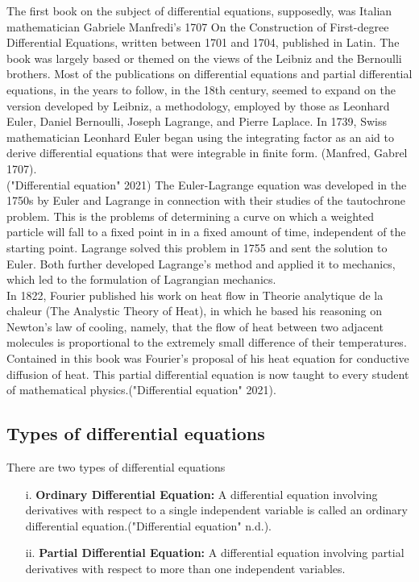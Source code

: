 \documentclass[12pt]{report}
\begin{document}
The first book on the subject of differential equations, supposedly, was Italian mathematician Gabriele Manfredi’s 1707 On the Construction of First-degree Differential Equations, written between 1701 and 1704, published in Latin. The book was largely based or themed on the views of the Leibniz and the Bernoulli brothers. Most of the publications on differential equations and partial differential equations, in the years to follow, in the 18th century, seemed to expand on the version developed by Leibniz, a methodology, employed by those as Leonhard Euler, Daniel Bernoulli, Joseph Lagrange, and Pierre Laplace. In 1739, Swiss mathematician Leonhard Euler began using the integrating factor as an aid to derive differential equations that were integrable in finite form. (Manfred, Gabrel 1707).\\

("Differential equation" 2021) The Euler-Lagrange equation was developed in the 1750s by Euler and Lagrange in connection with their studies of the tautochrone problem. This is the problems of determining a curve on which a weighted particle will fall to a fixed point in in a fixed amount of time, independent of the starting point. Lagrange solved this problem in 1755 and sent the solution to Euler. Both further developed Lagrange's method and applied it to mechanics, which led to the formulation of Lagrangian mechanics.\\

In 1822, Fourier published his work on heat flow in Theorie analytique de la chaleur (The Analystic Theory of Heat), in which he based his reasoning on Newton's law of cooling, namely, that the flow of heat between two adjacent molecules is proportional to the extremely small difference of their temperatures. Contained in this book was Fourier's proposal of his heat equation for conductive diffusion of heat. This partial differential equation is now taught to every student of mathematical physics.("Differential equation" 2021).

\subsection {Types of differential equations}
There are two types of differential equations
\begin{enumerate}
	\item[i.] \textbf{Ordinary Differential Equation:} A differential equation involving derivatives with respect to a single independent variable is called an ordinary differential equation.("Differential equation" n.d.).
  \item[ii.] \textbf{Partial Differential Equation:} A differential equation involving partial derivatives with respect to more than one independent variables. 
\end{enumerate}
\end{document}
